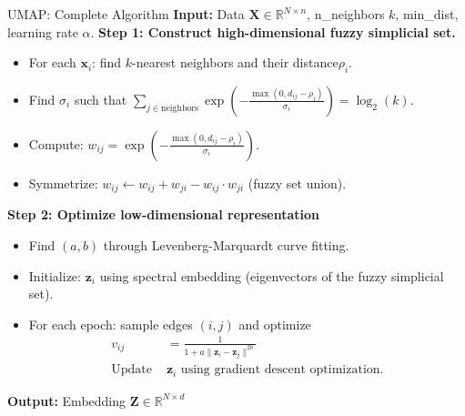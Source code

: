 \documentclass{beamer}
\begin{document}
\begin{frame}{UMAP: Complete Algorithm}
  \textbf{Input:} Data $\mathbf{X} \in \mathbb{R}^{N \times n}$, n\_neighbors $k$, min\_dist, learning rate $\alpha$.
  \textbf{Step 1: Construct high-dimensional fuzzy simplicial set.}
  \begin{itemize}
    \item For each $\mathbf{x}_i$: find $k$-nearest neighbors and their distance$\rho_i$.
    \item Find $\sigma_i$ such that $\sum_{j \in \text{neighbors}} \exp\left(-\frac{\max(0, d_{ij} - \rho_i)}{\sigma_i}\right) = \log_2(k)$.
    \item Compute: $w_{ij} = \exp\left(-\frac{\max(0, d_{ij} - \rho_i)}{\sigma_i}\right)$.
    \item Symmetrize: $w_{ij} \leftarrow w_{ij} + w_{ji} - w_{ij} \cdot w_{ji}$ (fuzzy set union).
  \end{itemize}
  
  \textbf{Step 2: Optimize low-dimensional representation}
  \begin{itemize}
    \item Find $(a,b)$ through Levenberg-Marquardt curve fitting.
    \item Initialize: $\mathbf{z}_i$ using \alert{spectral embedding}
      (eigenvectors of the fuzzy simplicial set).      
    \item For each epoch: sample edges $(i,j)$ and optimize
    \begin{align*}
      v_{ij} &= \frac{1}{1 + a\|\mathbf{z}_i - \mathbf{z}_j\|^{2b}} \\
      \text{Update } &\mathbf{z}_i \text{ using gradient descent optimization.}
    \end{align*}
  \end{itemize}
  
  \textbf{Output:} Embedding $\mathbf{Z} \in \mathbb{R}^{N \times d}$
\end{frame}
\end{document}

